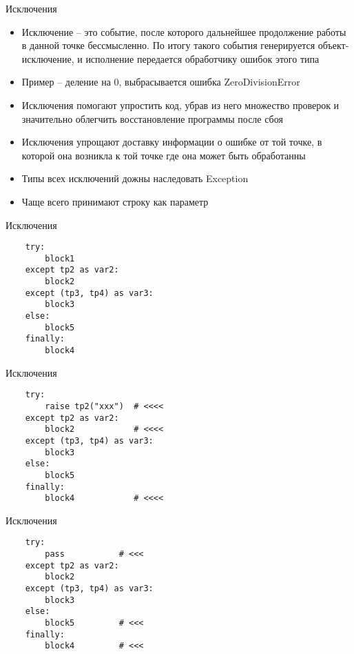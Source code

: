 \documentclass{article}
\begin{document}
\begin{center} Исключения \end{center}
\begin{itemize}
	\item Исключение – это событие, после которого дальнейшее продолжение 
			работы в данной точке бессмысленно. По итогу такого события 
			генерируется объект-исключение, и исполнение передается обработчику 
			ошибок этого типа
	\item Пример – деление на 0, выбрасывается ошибка ZeroDivisionError
	\item Исключения помогают упростить код, убрав из него множество 
			проверок и значительно облегчить восстановление программы после сбоя
	\item Исключения упрощают доставку информации о ошибке от той точке, 
			в которой она возникла к той точке где она может быть обработанны
	\item Типы всех исключений дожны наследовать Exception
	\item Чаще всего принимают строку как параметр
\end{itemize}
\newpage


\begin{center} Исключения \end{center}
\begin{lstlisting}
	try:
		block1
	except tp2 as var2:
		block2
	except (tp3, tp4) as var3:
		block3
	else:
		block5
	finally:
		block4
\end{lstlisting}
\newpage

\begin{center} Исключения \end{center}
\begin{lstlisting}
	try:
		raise tp2("xxx")  # <<<<
	except tp2 as var2:
		block2            # <<<<
	except (tp3, tp4) as var3:
		block3
	else:
		block5
	finally:
		block4            # <<<<
\end{lstlisting}
\newpage

\begin{center} Исключения \end{center}
\begin{lstlisting}
	try:
		pass           # <<<
	except tp2 as var2:
		block2
	except (tp3, tp4) as var3:
		block3
	else:
		block5         # <<<
	finally:
		block4         # <<<
\end{lstlisting}
\newpage
\end{document}
